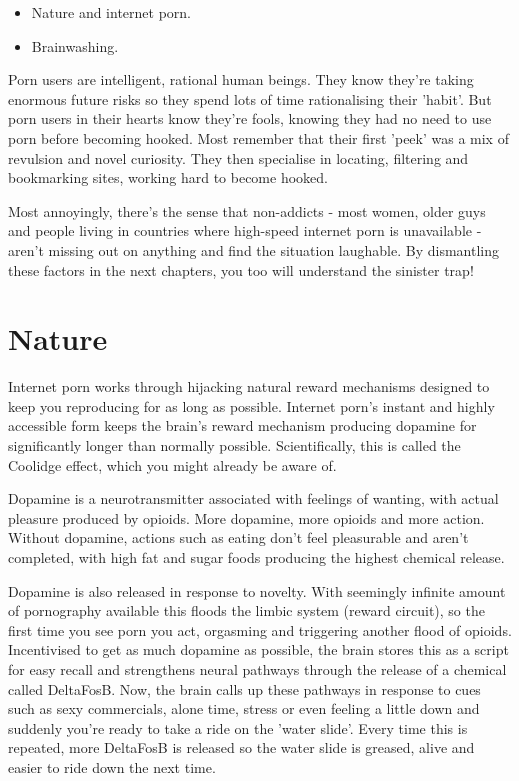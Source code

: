 \documentclass[
]{book}
\begin{document}
\begin{itemize}
\item
  Nature and internet porn.
\item
  Brainwashing.
\end{itemize}

Porn users are intelligent, rational human beings. They know they're taking enormous future risks so they spend lots of time rationalising their 'habit'. But porn users in their hearts know they're fools, knowing they had no need to use porn before becoming hooked. Most remember that their first 'peek' was a mix of revulsion and novel curiosity. They then specialise in locating, filtering and bookmarking sites, working hard to become hooked.

Most annoyingly, there's the sense that non-addicts - most women, older guys and people living in countries where high-speed internet porn is unavailable - aren't missing out on anything and find the situation laughable. By dismantling these factors in the next chapters, you too will understand the sinister trap!

\hypertarget{nature}{%
\chapter{Nature}\label{nature}}

Internet porn works through hijacking natural reward mechanisms designed to keep you reproducing for as long as possible. Internet porn's instant and highly accessible form keeps the brain's reward mechanism producing dopamine for significantly longer than normally possible. Scientifically, this is called the Coolidge effect, which you might already be aware of.

Dopamine is a neurotransmitter associated with feelings of wanting, with actual pleasure produced by opioids. More dopamine, more opioids and more action. Without dopamine, actions such as eating don't feel pleasurable and aren't completed, with high fat and sugar foods producing the highest chemical release.

Dopamine is also released in response to novelty. With seemingly infinite amount of pornography available this floods the limbic system (reward circuit), so the first time you see porn you act, orgasming and triggering another flood of opioids. Incentivised to get as much dopamine as possible, the brain stores this as a script for easy recall and strengthens neural pathways through the release of a chemical called DeltaFosB. Now, the brain calls up these pathways in response to cues such as sexy commercials, alone time, stress or even feeling a little down and suddenly you're ready to take a ride on the 'water slide'. Every time this is repeated, more DeltaFosB is released so the water slide is greased, alive and easier to ride down the next time.
\end{document}
